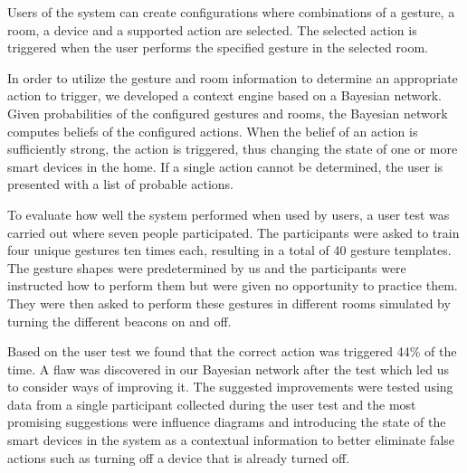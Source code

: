 Users of the system can create configurations where combinations of a gesture, a room, a device and a supported action are selected. The selected action is triggered when the user performs the specified gesture in the selected room.

In order to utilize the gesture and room information to determine an appropriate action to trigger, we developed a context engine based on a Bayesian network. Given probabilities of the configured gestures and rooms, the Bayesian network computes beliefs of the configured actions. When the belief of an action is sufficiently strong, the action is triggered, thus changing the state of one or more smart devices in the home. If a single action cannot be determined, the user is presented with a list of probable actions.

To evaluate how well the system performed when used by users, a user test was carried out where seven people participated.
The participants were asked to train four unique gestures ten times each, resulting in a total of 40 gesture templates.
The gesture shapes were predetermined by us and the participants were instructed how to perform them but were given no opportunity to practice them.
They were then asked to perform these gestures in different rooms simulated by turning the different beacons on and off.

Based on the user test we found that the correct action was triggered 44\% of the time.
A flaw was discovered in our Bayesian network after the test which led us to consider ways of improving it.
The suggested improvements were tested using data from a single participant collected during the user test and the most promising suggestions were influence diagrams and introducing the state of the smart devices in the system as a contextual information to better eliminate false actions such as turning off a device that is already turned off.

